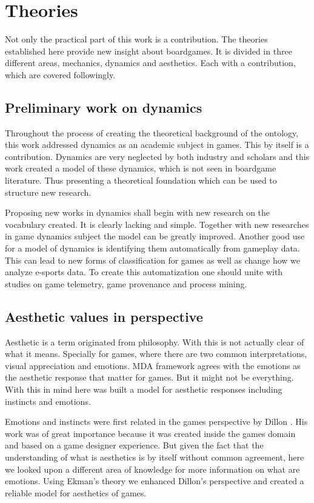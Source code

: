 
\section{Theories}

Not only the practical part of this work is a contribution. The theories established here provide new insight about boardgames. It is divided in three different areas, mechanics, dynamics and aesthetics. Each with a contribution, which are covered followingly.

\subsection{Preliminary work on dynamics}

Throughout the process of creating the theoretical background of the ontology, this work addressed dynamics as an academic subject in games. This by itself is a contribution. Dynamics are very neglected by both industry and scholars and this work created a model of these dynamics, which is not seen in boardgame literature. Thus presenting a theoretical foundation which can be used to structure new research.

Proposing new works in dynamics shall begin with new research on the vocabulary created. It is clearly lacking and simple. Together with new researches in game dynamics subject the model can be greatly improved. Another good use for a model of dynamics is identifying them automatically from gameplay data. This can lead to new forms of classification for games as well as change how we analyze e-sports data. To create this automatization one should unite with studies on game telemetry, game provenance and process mining.

\subsection{Aesthetic values in perspective}

Aesthetic is a term originated from philosophy. With this is not actually clear of what it means. Specially for games, where there are two common interpretations, visual appreciation and emotions. MDA  framework \cite{Hunicke2004} agrees with the emotions as the aesthetic response that matter for games. But it might not be everything. With this in mind here was built a model for aesthetic responses including instincts and emotions.

Emotions and instincts were first related in the games perspective by Dillon \cite{dillon_way_2010}. His work was of great importance because it was created inside the games domain and based on a game designer experience. But given the fact that the understanding of what is aesthetics is by itself without common agreement, here we looked upon a different area of knowledge for more information on what are emotions. Using Ekman's \cite{ekmans_atlas} theory we enhanced Dillon's perspective and created a reliable model for aesthetics of games.

